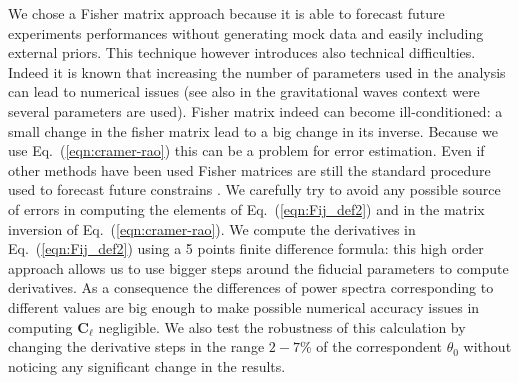 \documentclass[aps,prd,reprint,superscriptaddress]{revtex4-1}
\newcommand\refeq[1]{Eq.~(\ref{eqn:#1})}
\begin{document}
We chose a Fisher matrix approach because it is able to forecast future experiments performances without generating mock data and easily including external priors. 
This technique however introduces also technical difficulties. 
Indeed it is known \cite{2006astro.ph..9591A} that increasing the number of parameters used in the analysis can lead to numerical issues (see also \cite{2008PhRvD..77d2001V} in the gravitational waves context were several parameters are used).
Fisher matrix indeed can become ill-conditioned: a small change in the fisher matrix lead to a big change in its inverse. Because we use \refeq{cramer-rao} this can be a problem for error estimation. 
Even if other methods have been used \cite{2006JCAP...10..013P,2006astro.ph..9591A} Fisher matrices are still the standard procedure used to forecast future constrains \cite{wu:2014}.
We carefully try to avoid any possible source of errors in computing the elements of \refeq{Fij_def2} and in the matrix inversion of \refeq{cramer-rao}.
We compute the derivatives in \refeq{Fij_def2} using a 5 points finite difference formula:
this high order approach allows us to use bigger steps around the fiducial parameters to compute derivatives. As a consequence the differences of power spectra corresponding to different values are big enough to make possible numerical accuracy issues in computing $\boldsymbol{C}_\ell$ negligible.
We also test the robustness of this calculation by changing the derivative steps in the range $2-7\%$ of the correspondent $\theta_{0}$ without noticing any significant change in the results.
\end{document}
